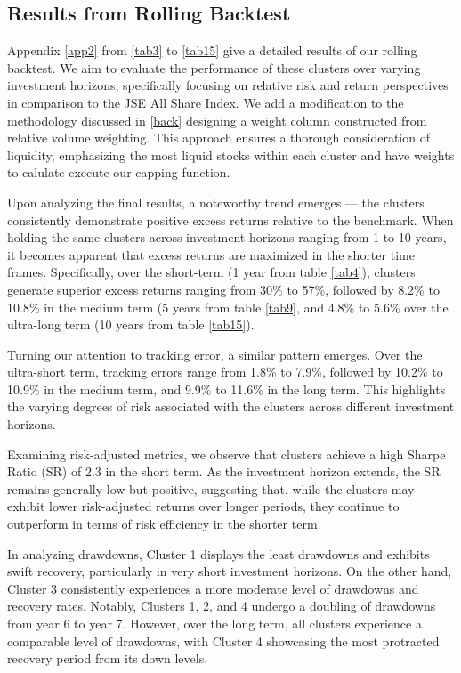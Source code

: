 \documentclass[11pt,preprint, authoryear]{elsarticle}
\numberwithin{equation}{section}
\numberwithin{figure}{section}
\numberwithin{table}{section}
\begin{document}
\hypertarget{results-from-rolling-backtest}{%
\subsection{Results from Rolling
Backtest}\label{results-from-rolling-backtest}}

Appendix \ref{app2} from \ref{tab3} to \ref{tab15} give a detailed
results of our rolling backtest. We aim to evaluate the performance of
these clusters over varying investment horizons, specifically focusing
on relative risk and return perspectives in comparison to the JSE All
Share Index. We add a modification to the methodology discussed in
\ref{back} designing a weight column constructed from relative volume
weighting. This approach ensures a thorough consideration of liquidity,
emphasizing the most liquid stocks within each cluster and have weights
to calulate execute our capping function.

Upon analyzing the final results, a noteworthy trend emerges --- the
clusters consistently demonstrate positive excess returns relative to
the benchmark. When holding the same clusters across investment horizons
ranging from 1 to 10 years, it becomes apparent that excess returns are
maximized in the shorter time frames. Specifically, over the short-term
(1 year from table \ref{tab4}), clusters generate superior excess
returns ranging from 30\% to 57\%, followed by 8.2\% to 10.8\% in the
medium term (5 years from table \ref{tab9}, and 4.8\% to 5.6\% over the
ultra-long term (10 years from table \ref{tab15}).

Turning our attention to tracking error, a similar pattern emerges. Over
the ultra-short term, tracking errors range from 1.8\% to 7.9\%,
followed by 10.2\% to 10.9\% in the medium term, and 9.9\% to 11.6\% in
the long term. This highlights the varying degrees of risk associated
with the clusters across different investment horizons.

Examining risk-adjusted metrics, we observe that clusters achieve a high
Sharpe Ratio (SR) of 2.3 in the short term. As the investment horizon
extends, the SR remains generally low but positive, suggesting that,
while the clusters may exhibit lower risk-adjusted returns over longer
periods, they continue to outperform in terms of risk efficiency in the
shorter term.

In analyzing drawdowns, Cluster 1 displays the least drawdowns and
exhibits swift recovery, particularly in very short investment horizons.
On the other hand, Cluster 3 consistently experiences a more moderate
level of drawdowns and recovery rates. Notably, Clusters 1, 2, and 4
undergo a doubling of drawdowns from year 6 to year 7. However, over the
long term, all clusters experience a comparable level of drawdowns, with
Cluster 4 showcasing the most protracted recovery period from its down
levels. \newpage
\end{document}
